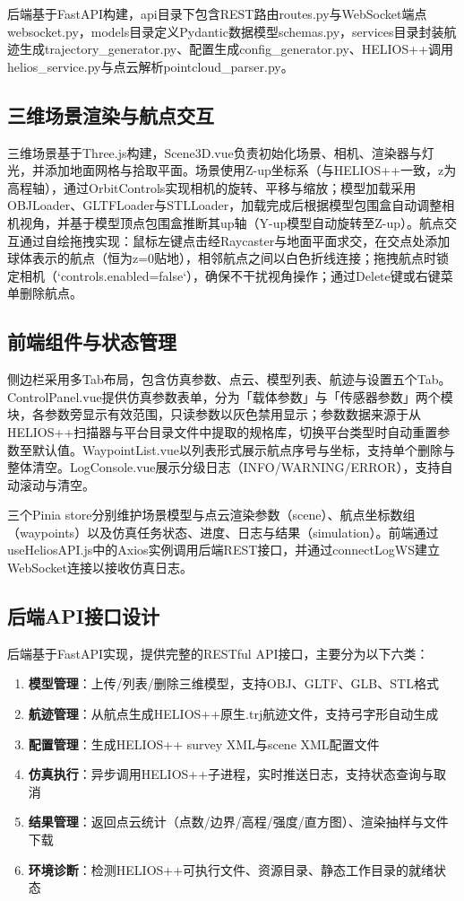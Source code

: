 \documentclass[a4paper,fleqn]{cas-sc}
\begin{document}
后端基于FastAPI构建，api目录下包含REST路由routes.py与WebSocket端点websocket.py，models目录定义Pydantic数据模型schemas.py，services目录封装航迹生成trajectory\_generator.py、配置生成config\_generator.py、HELIOS++调用helios\_service.py与点云解析pointcloud\_parser.py。

\subsection{三维场景渲染与航点交互}
三维场景基于Three.js构建，Scene3D.vue负责初始化场景、相机、渲染器与灯光，并添加地面网格与拾取平面。场景使用Z-up坐标系（与HELIOS++一致，z为高程轴），通过OrbitControls实现相机的旋转、平移与缩放；模型加载采用OBJLoader、GLTFLoader与STLLoader，加载完成后根据模型包围盒自动调整相机视角，并基于模型顶点包围盒推断其up轴（Y-up模型自动旋转至Z-up）。航点交互通过自绘拖拽实现：鼠标左键点击经Raycaster与地面平面求交，在交点处添加球体表示的航点（恒为z=0贴地），相邻航点之间以白色折线连接；拖拽航点时锁定相机（`controls.enabled=false`），确保不干扰视角操作；通过Delete键或右键菜单删除航点。

\subsection{前端组件与状态管理}
侧边栏采用多Tab布局，包含仿真参数、点云、模型列表、航迹与设置五个Tab。ControlPanel.vue提供仿真参数表单，分为「载体参数」与「传感器参数」两个模块，各参数旁显示有效范围，只读参数以灰色禁用显示；参数数据来源于从HELIOS++扫描器与平台目录文件中提取的规格库，切换平台类型时自动重置参数至默认值。WaypointList.vue以列表形式展示航点序号与坐标，支持单个删除与整体清空。LogConsole.vue展示分级日志（INFO/WARNING/ERROR），支持自动滚动与清空。

三个Pinia store分别维护场景模型与点云渲染参数（scene）、航点坐标数组（waypoints）以及仿真任务状态、进度、日志与结果（simulation）。前端通过useHeliosAPI.js中的Axios实例调用后端REST接口，并通过connectLogWS建立WebSocket连接以接收仿真日志。

\subsection{后端API接口设计}
后端基于FastAPI实现，提供完整的RESTful API接口，主要分为以下六类：

\begin{enumerate}
    \item \textbf{模型管理}：上传/列表/删除三维模型，支持OBJ、GLTF、GLB、STL格式
    \item \textbf{航迹管理}：从航点生成HELIOS++原生.trj航迹文件，支持弓字形自动生成
    \item \textbf{配置管理}：生成HELIOS++ survey XML与scene XML配置文件
    \item \textbf{仿真执行}：异步调用HELIOS++子进程，实时推送日志，支持状态查询与取消
    \item \textbf{结果管理}：返回点云统计（点数/边界/高程/强度/直方图）、渲染抽样与文件下载
    \item \textbf{环境诊断}：检测HELIOS++可执行文件、资源目录、静态工作目录的就绪状态
\end{enumerate}
\end{document}
